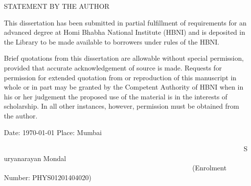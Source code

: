 \newpage

\begin{center}
  \vspace*{5em}
  \large
  \uppercase{Statement by the Author}
\end{center}

\normalsize

{\rm This dissertation has been submitted in partial fulfillment of requirements for an advanced degree at Homi Bhabha National Institute (HBNI) and is deposited in the Library to be made available to borrowers under rules of the HBNI.}

\vskip 5pt
{\rm Brief quotations from this dissertation are allowable without special permission, provided that accurate acknowledgement of source is made. Requests for permission for extended quotation from or reproduction of this manuscript in whole or in part may be granted by the Competent Authority of HBNI when in his or her judgement the proposed use of the material is in the interests of scholarship. In all other instances, however, permission must be obtained from the author.}

\vskip 30pt
{\rm Date: \today}
\vskip 5pt
{\rm Place: Mumbai}
\vskip 30pt


\hspace{6cm}

~~~~~~~~~~~~~~~~~~~~~~~~~~~~~~~~~~~~~~~~~~~~~~~~~~~~~~~~~~~~~~~~~~~~~~{\rm Suryanarayan Mondal}
\vskip 5pt
~~~~~~~~~~~~~~~~~~~~~~~~~~~~~~~~~~~~~~~~~~~~~~~~~~~~~~~{\rm (Enrolment Number: PHYS01201404020)}


